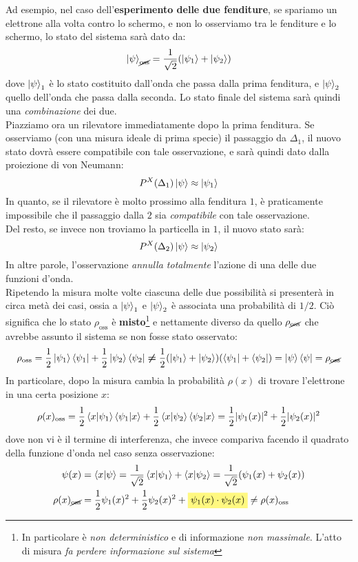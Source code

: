\documentclass[../../FisicaTeorica.tex]{subfiles}
\begin{document}
Ad esempio, nel caso dell'\textbf{esperimento delle due fenditure}, se spariamo un elettrone alla volta contro lo schermo, e non lo osserviamo tra le fenditure e lo schermo, lo stato del sistema sarà dato da:
\[
\ket{\psi}_{\cancel{\text{oss}}}=\frac{1}{\sqrt{2}}(\ket{\psi_1}+\ket{\psi_2})
\]
dove $\ket{\psi}_1$ è lo stato costituito dall'onda che passa dalla prima fenditura, e $\ket{\psi}_2$ quello dell'onda che passa dalla seconda. Lo stato finale del sistema sarà quindi una \textit{combinazione} dei due.\\
Piazziamo ora un rilevatore immediatamente dopo la prima fenditura. Se osserviamo (con una misura ideale di prima specie) il passaggio da $\Delta_1$, il nuovo stato dovrà essere compatibile con tale osservazione, e sarà quindi dato dalla proiezione di von Neumann:
\[
P^X(\Delta_1)\ket{\psi} \approx \ket{\psi_1}
\]
In quanto, se il rilevatore è molto prossimo alla fenditura $1$, è praticamente impossibile che il passaggio dalla $2$ sia \textit{compatibile} con tale osservazione.\\
Del resto, se invece non troviamo la particella in $1$, il nuovo stato sarà:
\[
P^X(\Delta_2)\ket{\psi} \approx \ket{\psi_2}
\]
In altre parole, l'osservazione \textit{annulla totalmente} l'azione di una delle due funzioni d'onda.\\
Ripetendo la misura molte volte ciascuna delle due possibilità si presenterà in circa metà dei casi, ossia a $\ket{\psi}_1$ e $\ket{\psi}_2$ è associata una probabilità di $1/2$. Ciò significa che lo stato $\rho_{\text{oss}}$ è \textbf{misto}\footnote{In particolare è \textit{non deterministico} e di informazione \textit{non massimale}. L'atto di misura \textit{fa perdere informazione sul sistema}} e nettamente diverso da quello $\rho_{\cancel{\text{oss}}}$ che avrebbe assunto il sistema se non fosse stato osservato:
\[
\rho_{\text{oss}}=
\frac{1}{2}\ket{\psi_1}\bra{\psi_1}+\frac{1}{2}\ket{\psi_2}\bra{\psi_2} \bm{\neq} \frac{1}{2}(\ket{\psi_1}+\ket{\psi_2})(\bra{\psi_1}+\bra{\psi_2})=\ket{\psi}\bra{\psi} = \rho_{\cancel{\text{oss}}}
\]
In particolare, dopo la misura cambia la probabilità $\rho(x)$ di trovare l'elettrone in una certa posizione $x$:
\[
\rho(x)_{\text{oss}}=\frac{1}{2}\braket{x|\psi_1}\braket{\psi_1|x}+\frac{1}{2}\braket{x|\psi_2}\braket{\psi_2|x}=\frac{1}{2}|\psi_1(x)|^2+\frac{1}{2}|\psi_2(x)|^2
\]
dove non vi è il termine di interferenza, che invece compariva facendo il quadrato della funzione d'onda nel caso senza osservazione:
\begin{align*}
\psi(x)&=\braket{x|\psi}=\frac{1}{\sqrt{2}}\braket{x|\psi_1}+\braket{x|\psi_2}=\frac{1}{\sqrt{2}}(\psi_1(x)+\psi_2(x))\\
\rho(x)_{\cancel{\text{oss}}} &= \frac{1}{2}\psi_1(x)^2 + \frac{1}{2}\psi_2(x)^2 + \hlc{Yellow}{\psi_1(x)\cdot \psi_2(x)} \neq \rho(x)_{\text{oss}}
\end{align*}
\end{document}
